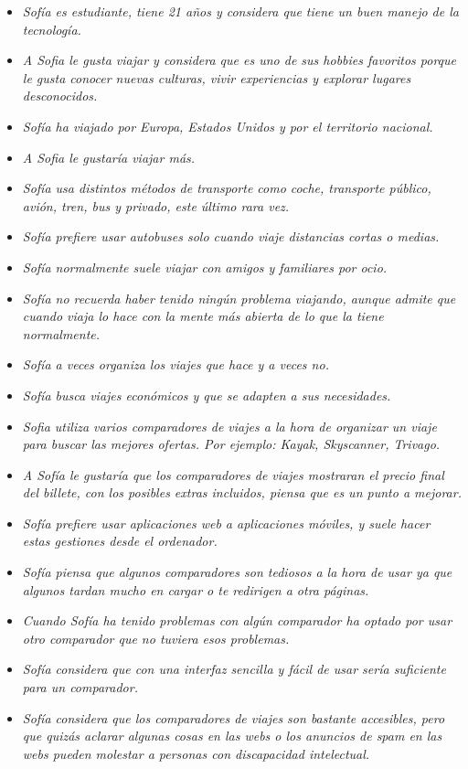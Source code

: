 \begin{itemize}
    \item \textit{Sofía es estudiante, tiene 21 años y considera que tiene un buen manejo de la tecnología.}
    \item \textit{A Sofia le gusta viajar y considera que es uno de sus hobbies favoritos porque le gusta conocer nuevas culturas, vivir experiencias y explorar lugares desconocidos.}
    \item \textit{Sofía ha viajado por Europa, Estados Unidos y por el territorio nacional.}
    \item \textit{A Sofia le gustaría viajar más.}
    \item \textit{Sofía usa distintos métodos de transporte como coche, transporte público, avión, tren, bus y privado, este último rara vez.}
    \item \textit{Sofía prefiere usar autobuses solo cuando viaje distancias cortas o medias.}
    \item \textit{Sofía normalmente suele viajar con amigos y familiares por ocio.}
    \item \textit{Sofía no recuerda haber tenido ningún problema viajando, aunque admite que cuando viaja lo hace con la mente más abierta de lo que la tiene normalmente.}
    \item \textit{Sofía a veces organiza los viajes que hace y a veces no.}
    \item \textit{Sofía busca viajes económicos y que se adapten a sus necesidades.}
    \item \textit{Sofia utiliza varios comparadores de viajes a la hora de organizar un viaje para buscar las mejores ofertas. Por ejemplo: Kayak, Skyscanner, Trivago.}
    \item \textit{A Sofía le gustaría que los comparadores de viajes mostraran el precio final del billete, con los posibles extras incluidos, piensa que es un punto a mejorar.}
    \item \textit{Sofía prefiere usar aplicaciones web a aplicaciones móviles, y suele hacer estas gestiones desde el ordenador.}
    \item \textit{Sofía piensa que algunos comparadores son tediosos a la hora de usar ya que algunos tardan mucho en cargar o te redirigen a otra páginas.}
    \item \textit{Cuando Sofía ha tenido problemas con algún comparador ha optado por usar otro comparador que no tuviera esos problemas.}
    \item \textit{Sofía considera que con una interfaz sencilla y fácil de usar sería suficiente para un comparador.}
    \item \textit{Sofía considera que los comparadores de viajes son bastante accesibles, pero que quizás aclarar algunas cosas en las webs o los anuncios de spam en las webs pueden molestar a personas con discapacidad intelectual.}
    
\end{itemize}

